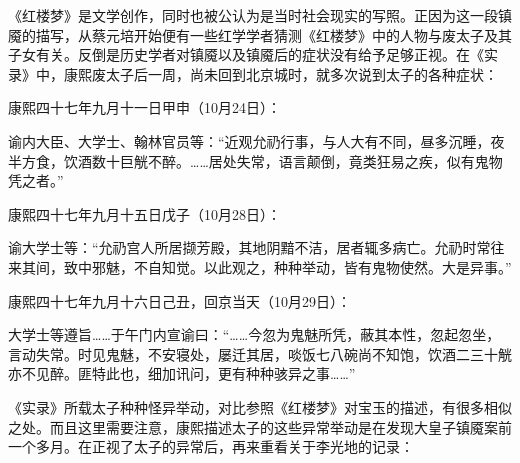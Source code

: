 
《红楼梦》是文学创作，同时也被公认为是当时社会现实的写照。正因为这一段镇魇的描写，从蔡元培开始便有一些红学学者猜测《红楼梦》中的人物与废太子及其子女有关。反倒是历史学者对镇魇以及镇魇后的症状没有给予足够正视。在《实录》中，康熙废太子后一周，尚未回到北京城时，就多次说到太子的各种症状：



\begin{bookquote}康熙四十七年九月十一日甲申（10月24日）：\end{bookquote}


\begin{bookquote}谕内大臣、大学士、翰林官员等：“近观允礽行事，与人大有不同，昼多沉睡，夜半方食，饮酒数十巨觥不醉。……居处失常，语言颠倒，竟类狂易之疾，似有鬼物凭之者。”\end{bookquote}


\begin{bookquote}康熙四十七年九月十五日戊子（10月28日）：\end{bookquote}


\begin{bookquote}谕大学士等：“允礽宫人所居撷芳殿，其地阴黯不洁，居者辄多病亡。允礽时常往来其间，致中邪魅，不自知觉。以此观之，种种举动，皆有鬼物使然。大是异事。”\end{bookquote}


\begin{bookquote}康熙四十七年九月十六日己丑，回京当天（10月29日）：\end{bookquote}


\begin{bookquote}大学士等遵旨……于午门内宣谕曰：“……今忽为鬼魅所凭，蔽其本性，忽起忽坐，言动失常。时见鬼魅，不安寝处，屡迁其居，啖饭七八碗尚不知饱，饮酒二三十觥亦不见醉。匪特此也，细加讯问，更有种种骇异之事……”\end{bookquote}


《实录》所载太子种种怪异举动，对比参照《红楼梦》对宝玉的描述，有很多相似之处。而且这里需要注意，康熙描述太子的这些异常举动是在发现大皇子镇魇案前一个多月。在正视了太子的异常后，再来重看关于李光地的记录：



